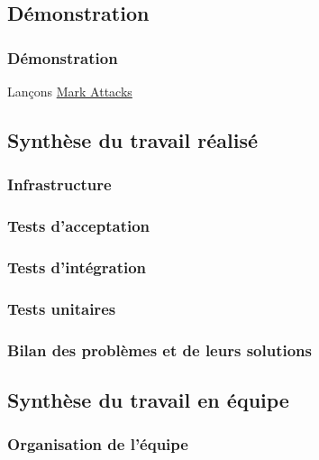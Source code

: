 \documentclass{beamer}
\begin{document}
    \subsection{Démonstration}
      \begin{frame}
        \frametitle{Démonstration}
	      \begin{center}
          {\LARGE Lançons \href{http://localhost/m2test6/markattaks-tmp/website/}{Mark Attacks}}
	      \end{center}
	    \end{frame}
    
    \subsection{Synthèse du travail réalisé}
    
      \subsubsection{Infrastructure}
      
      \subsubsection{Tests d'acceptation}
      
      \subsubsection{Tests d'intégration}
      
      \subsubsection{Tests unitaires}
      
      \subsubsection{Bilan des problèmes et de leurs solutions}
      
    \subsection{Synthèse du travail en équipe}
      
      \subsubsection{Organisation de l'équipe}
      
\end{document}
